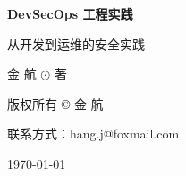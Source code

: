 \begin{titlepage}
    \centering
    \vspace*{3cm}
    {\Huge\bfseries DevSecOps 工程实践\par}
    \vspace{0.6cm}
    {\Large 从开发到运维的安全实践\par}
    \vspace{1cm}

    {\raggedleft \Large 金 航 \(\odot\) 著\par}

    \vfill
\end{titlepage}

\thispagestyle{empty}
\vspace*{\fill}
\begin{flushleft}
    {\large 版权所有 \copyright{} \copyrightyear{} 金 航\par}
    \vspace{0.5cm}
    {\large 联系方式：hang.j@foxmail.com\par}
    \vspace{0.5cm}
    {\large \today\par}
\end{flushleft}
\newpage